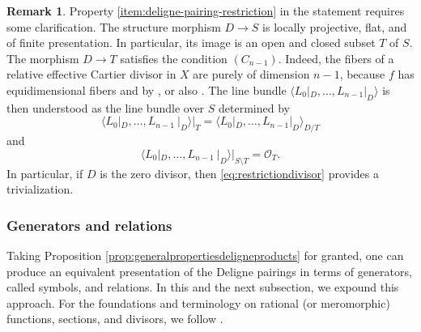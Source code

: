 \documentclass[11pt]{article}
\theoremstyle{plain}
\theoremstyle{definition}
\newtheorem{remark}[theorem]{Remark}
\newcommand{\Ocal}{\mathcal O}
\begin{document}
\begin{remark}\label{rmk:clarification-restriction}
Property \eqref{item:deligne-pairing-restriction} in the statement requires some clarification. The structure morphism $D\to S$ is locally projective, flat, and of finite presentation. In particular, its image is an open and closed subset $T$ of $S$. The morphism $D\to T$ satisfies the condition $(C_{n-1})$. Indeed, the fibers of a relative effective Cartier divisor in $X$ are purely of dimension $n-1$, because $f$ has equidimensional fibers and by \cite[Prop.\,16.4.1]{EGAIV1}, or also \cite[Cor.\,5.2.4]{EGAIV2}. The line bundle $\langle L_{0}|_D,\ldots,L_{n-1}|_D\rangle$ is then understood as the line bundle over $S$ determined by
\begin{displaymath}
\langle L_{0}|_D,\ldots,L_{n-1}\ |_D\rangle\big|_{T}=\langle L_{0}|_D,\ldots,L_{n-1}|_D\rangle_{D/T}
\end{displaymath}
and
\begin{displaymath}
\langle L_{0}|_D,\ldots,L_{n-1}\ |_D\rangle\big|_{S\setminus T}=\Ocal_{T}.
\end{displaymath}
In particular, if $D$ is the zero divisor, then \eqref{eq:restrictiondivisor} provides a trivialization.
\end{remark}

\subsubsection{Generators and relations}\label{subsubsec:generators-relations}
Taking Proposition \ref{prop:generalpropertiesdeligneproducts} for granted, one can produce an equivalent presentation of the Deligne pairings in terms of generators, called symbols, and relations. In this and the next subsection, we expound this approach. For the foundations and terminology on rational (or meromorphic) functions, sections, and divisors, we follow \cite[ \& ]{EGAIV4}.
\end{document}
